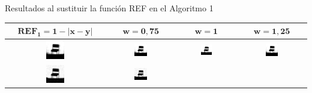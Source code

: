 \documentclass{beamer}
\theoremstyle{plain} %
\theoremstyle{definition}
\newcommand{\abs}[1]{\left\vert#1\right\vert}
\newcommand{\bb}{\bfseries}
\begin{document}
\begin{frame}{Resultados al sustituir la función REF en el Algoritmo 1}
  \begin{table}
  \centering
  \begin{tabular}{c||c|c|c}
  $\mathbf{REF_1=1-\abs{x-y}}$ & $\mathbf{w=0,75}$ &\bb $\mathbf{w=1}$ &\bb $\mathbf{w=1,25}$\\\hline\hline
  \includegraphics[width=0.2\textwidth]{img/res/e1a/alg1tipo1-chairga.jpg} &
  \includegraphics[width=0.2\textwidth]{img/res/e1a/alg1tipo6-chairga.jpg} &
  \includegraphics[width=0.2\textwidth]{img/res/e1a/alg1tipo6d0.75-chairga.jpg} &
  \includegraphics[width=0.2\textwidth]{img/res/e1a/alg1tipo6d1.25-chairga.jpg} \\
  \includegraphics[width=0.2\textwidth]{img/res/e1a/alg1tipo1-chairsp005.jpg} &
  \includegraphics[width=0.2\textwidth]{img/res/e1a/alg1tipo6-chairsp005.jpg} &

\end{tabular}
\end{table}
\end{frame}
\end{document}
